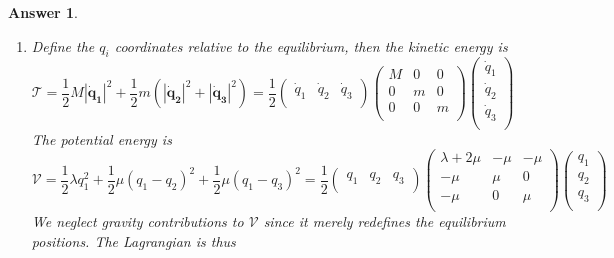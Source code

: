 \documentclass[a4paper]{article}
\newtheorem{ans}{Answer}[section]
\theoremstyle{new}
\begin{document}
\begin{ans}
\begin{enumerate}[label=(\roman*)]
$$-\omega^2\mathbf{Ta_n}=-\mathbf{Va_n}\implies\det|\mathbf{V}-\omega^2\mathbf{T}|=0$$
the normal modes are thus the corresponding eigenvectors for each normal frequency.
\item Define the $q_i$ coordinates relative to the equilibrium, then the kinetic energy is
$$\mathcal{T}=\frac{1}{2}M|\mathbf{\dot{q}_1}|^2+\frac{1}{2}m(|\mathbf{\dot{q}_2}|^2+|\mathbf{\dot{q}_3}|^2)=\frac{1}{2}\begin{pmatrix}\dot{q}_1&\dot{q}_2&\dot{q}_3\\\end{pmatrix}\begin{pmatrix}M&0&0\\0&m&0\\0&0&m\\\end{pmatrix}\begin{pmatrix}\dot{q}_1\\\dot{q}_2\\\dot{q}_3\\\end{pmatrix}$$
The potential energy is
$$\mathcal{V}=\frac{1}{2}\lambda q_1^2+\frac{1}{2}\mu(q_1-q_2)^2+\frac{1}{2}\mu(q_1-q_3)^2=\frac{1}{2}\begin{pmatrix}q_1&q_2&q_3\\\end{pmatrix}\begin{pmatrix}\lambda+2\mu&-\mu&-\mu\\-\mu&\mu&0\\-\mu&0&\mu\\\end{pmatrix}\begin{pmatrix}q_1\\q_2\\q_3\\\end{pmatrix}$$
We neglect gravity contributions to $\mathcal{V}$ since it merely redefines the equilibrium positions. The Lagrangian is thus

\end{enumerate}
\end{ans}
\end{document}
